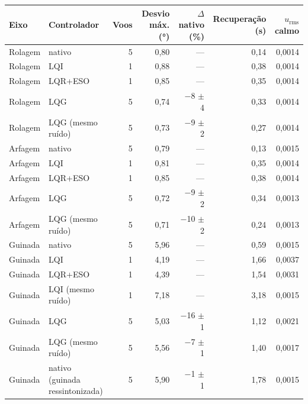 \begin{tabular}{llrrrrr}
\toprule
Eixo & Controlador & Voos & Desvio máx. (\si{\degree}) & $\Delta$ nativo (\%) & Recuperação (\si{\second}) & $u_\mathrm{rms}$ calmo \\
\midrule
Rolagem & nativo & 5 & 0,80 & --- & 0,14 & 0,0014 \\
Rolagem & LQI & 1 & 0,88 & --- & 0,38 & 0,0014 \\
Rolagem & LQR+ESO & 1 & 0,85 & --- & 0,35 & 0,0014 \\
Rolagem & LQG & 5 & 0,74 & $-$8 $\pm$ 4 & 0,33 & 0,0014 \\
Rolagem & LQG (mesmo ruído) & 5 & 0,73 & $-$9 $\pm$ 2 & 0,27 & 0,0014 \\
\addlinespace
Arfagem & nativo & 5 & 0,79 & --- & 0,13 & 0,0015 \\
Arfagem & LQI & 1 & 0,81 & --- & 0,35 & 0,0014 \\
Arfagem & LQR+ESO & 1 & 0,85 & --- & 0,38 & 0,0014 \\
Arfagem & LQG & 5 & 0,72 & $-$9 $\pm$ 2 & 0,34 & 0,0013 \\
Arfagem & LQG (mesmo ruído) & 5 & 0,71 & $-$10 $\pm$ 2 & 0,24 & 0,0013 \\
\addlinespace
Guinada & nativo & 5 & 5,96 & --- & 0,59 & 0,0015 \\
Guinada & LQI & 1 & 4,19 & --- & 1,66 & 0,0037 \\
Guinada & LQR+ESO & 1 & 4,39 & --- & 1,54 & 0,0031 \\
Guinada & LQI (mesmo ruído) & 1 & 7,18 & --- & 3,18 & 0,0015 \\
Guinada & LQG & 5 & 5,03 & $-$16 $\pm$ 1 & 1,12 & 0,0021 \\
Guinada & LQG (mesmo ruído) & 5 & 5,56 & $-$7 $\pm$ 1 & 1,40 & 0,0017 \\
Guinada & nativo (guinada ressintonizada) & 5 & 5,90 & $-$1 $\pm$ 1 & 1,78 & 0,0015 \\
\bottomrule
\end{tabular}
